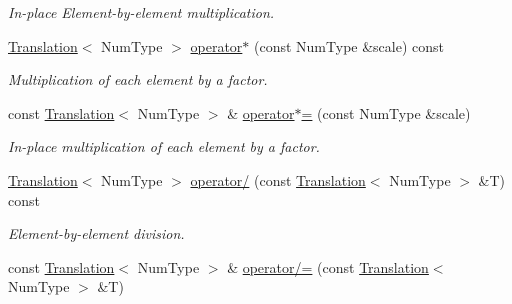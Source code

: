 \begin{DoxyCompactItemize}
\begin{DoxyCompactList}\small\item\em In-\/place Element-\/by-\/element multiplication. \end{DoxyCompactList}\item 
\hypertarget{singletonscrews_1_1_translation_ad6e74c700977767fa5ca4962e0b13732}{\hyperlink{singletonscrews_1_1_translation}{Translation}$<$ Num\+Type $>$ \hyperlink{singletonscrews_1_1_translation_ad6e74c700977767fa5ca4962e0b13732}{operator$\ast$} (const Num\+Type \&scale) const }\label{singletonscrews_1_1_translation_ad6e74c700977767fa5ca4962e0b13732}

\begin{DoxyCompactList}\small\item\em Multiplication of each element by a factor. \end{DoxyCompactList}\item 
\hypertarget{singletonscrews_1_1_translation_aafadcc399763ed36952bb304c06c35ba}{const \hyperlink{singletonscrews_1_1_translation}{Translation}$<$ Num\+Type $>$ \& \hyperlink{singletonscrews_1_1_translation_aafadcc399763ed36952bb304c06c35ba}{operator$\ast$=} (const Num\+Type \&scale)}\label{singletonscrews_1_1_translation_aafadcc399763ed36952bb304c06c35ba}

\begin{DoxyCompactList}\small\item\em In-\/place multiplication of each element by a factor. \end{DoxyCompactList}\item 
\hypertarget{singletonscrews_1_1_translation_ab93cd8e70a3cbf34567aefe6fc903ab6}{\hyperlink{singletonscrews_1_1_translation}{Translation}$<$ Num\+Type $>$ \hyperlink{singletonscrews_1_1_translation_ab93cd8e70a3cbf34567aefe6fc903ab6}{operator/} (const \hyperlink{singletonscrews_1_1_translation}{Translation}$<$ Num\+Type $>$ \&T) const }\label{singletonscrews_1_1_translation_ab93cd8e70a3cbf34567aefe6fc903ab6}

\begin{DoxyCompactList}\small\item\em Element-\/by-\/element division. \end{DoxyCompactList}\item 
\hypertarget{singletonscrews_1_1_translation_a6d85aab2827efd0dc6742f81defed644}{const \hyperlink{singletonscrews_1_1_translation}{Translation}$<$ Num\+Type $>$ \& \hyperlink{singletonscrews_1_1_translation_a6d85aab2827efd0dc6742f81defed644}{operator/=} (const \hyperlink{singletonscrews_1_1_translation}{Translation}$<$ Num\+Type $>$ \&T)}\label{singletonscrews_1_1_translation_a6d85aab2827efd0dc6742f81defed644}


\end{DoxyCompactItemize}
